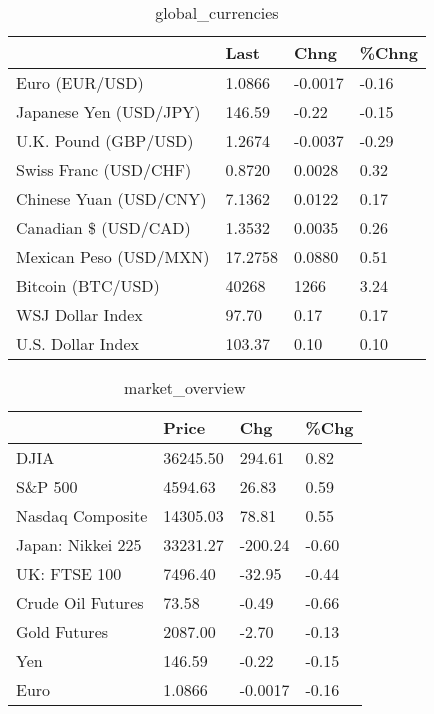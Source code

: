 \documentclass{article}%
\begin{document}
%


\begin{table}[htbp]%
\caption{global\_currencies}%
\centering%
\begin{adjustbox}{width=1\textwidth}%
\begin{tabular}{llll}
\toprule
                       &    Last &    Chng & \%Chng \\
\midrule
        Euro (EUR/USD) &  1.0866 & -0.0017 & -0.16 \\
Japanese Yen (USD/JPY) &  146.59 &   -0.22 & -0.15 \\
  U.K. Pound (GBP/USD) &  1.2674 & -0.0037 & -0.29 \\
 Swiss Franc (USD/CHF) &  0.8720 &  0.0028 &  0.32 \\
Chinese Yuan (USD/CNY) &  7.1362 &  0.0122 &  0.17 \\
  Canadian \$ (USD/CAD) &  1.3532 &  0.0035 &  0.26 \\
Mexican Peso (USD/MXN) & 17.2758 &  0.0880 &  0.51 \\
     Bitcoin (BTC/USD) &   40268 &    1266 &  3.24 \\
      WSJ Dollar Index &   97.70 &    0.17 &  0.17 \\
     U.S. Dollar Index &  103.37 &    0.10 &  0.10 \\
\bottomrule
\end{tabular}
%
\end{adjustbox}%
\end{table}

%


\begin{table}[htbp]%
\caption{market\_overview}%
\centering%
\begin{adjustbox}{width=1\textwidth}%
\begin{tabular}{llll}
\toprule
                  &    Price &     Chg &  \%Chg \\
\midrule
             DJIA & 36245.50 &  294.61 &  0.82 \\
          S\&P 500 &  4594.63 &   26.83 &  0.59 \\
 Nasdaq Composite & 14305.03 &   78.81 &  0.55 \\
Japan: Nikkei 225 & 33231.27 & -200.24 & -0.60 \\
     UK: FTSE 100 &  7496.40 &  -32.95 & -0.44 \\
Crude Oil Futures &    73.58 &   -0.49 & -0.66 \\
     Gold Futures &  2087.00 &   -2.70 & -0.13 \\
              Yen &   146.59 &   -0.22 & -0.15 \\
             Euro &   1.0866 & -0.0017 & -0.16 \\
\bottomrule
\end{tabular}
%
\end{adjustbox}%
\end{table}

%
\end{document}
